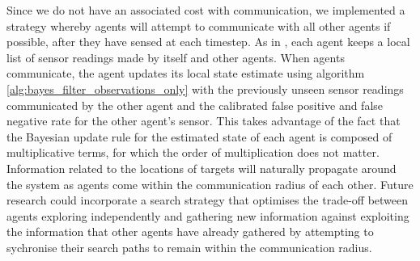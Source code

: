 Since we do not have an associated cost with communication, we implemented a strategy whereby agents will attempt to communicate with all other agents if possible, after they have sensed at each timestep. As in \cite{Waharte2009CoordinatedRAVs}, each agent keeps a local list of sensor readings made by itself and other agents. When agents communicate, the agent updates its local state estimate using algorithm \ref{alg:bayes_filter_observations_only} with the previously unseen sensor readings communicated by the other agent and the calibrated false positive and false negative rate for the other agent's sensor. This takes advantage of the fact that the Bayesian update rule for the estimated state of each agent is composed of multiplicative terms, for which the order of multiplication does not matter. Information related to the locations of targets will naturally propagate around the system as agents come within the communication radius of each other. Future research could incorporate a search strategy that optimises the trade-off between agents exploring independently and gathering new information against exploiting the information that other agents have already gathered by attempting to sychronise their search paths to remain within the communication radius.
